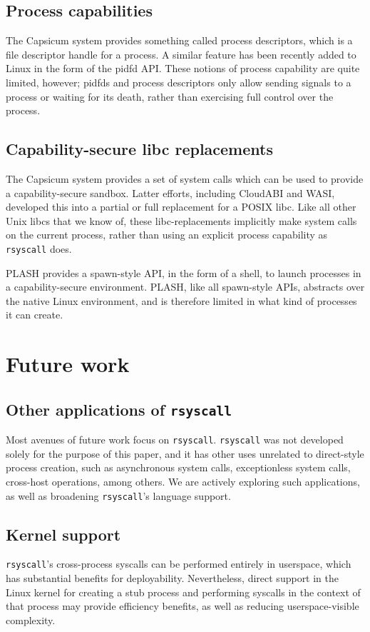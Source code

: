 \documentclass[letterpaper,twocolumn,10pt]{article}
\begin{document}
\subsection{Process capabilities}
The Capsicum system provides something called process descriptors\cite{capsicum},
which is a file descriptor handle for a process.
A similar feature has been recently added to Linux in the form of the pidfd API\cite{pidfd}.
These notions of process capability are quite limited, however;
pidfds and process descriptors only allow sending signals to a process or waiting for its death,
rather than exercising full control over the process.
\subsection{Capability-secure libc replacements}
The Capsicum system provides a set of system calls
which can be used to provide a capability-secure sandbox.\cite{capsicum}
Latter efforts\cite{oblivious}, including CloudABI\cite{cloudabi} and WASI\cite{wasi},
developed this into a partial or full replacement for a POSIX libc.
Like all other Unix libcs that we know of,
these libc-replacements implicitly make system calls on the current process,
rather than using an explicit process capability as \texttt{rsyscall} does.

PLASH provides a spawn-style API, in the form of a shell,
to launch processes in a capability-secure environment.\cite{plash}
PLASH, like all spawn-style APIs, abstracts over the native Linux environment,
and is therefore limited in what kind of processes it can create.
\section{Future work}\label{future_work}
\subsection{Other applications of \texttt{rsyscall}}
Most avenues of future work focus on \texttt{rsyscall}.
\texttt{rsyscall} was not developed solely for the purpose of this paper,
and it has other uses unrelated to direct-style process creation,
such as asynchronous system calls, exceptionless system calls\cite{flexsc}, cross-host operations, among others.
We are actively exploring such applications,
as well as broadening \texttt{rsyscall}'s language support.
\subsection{Kernel support}
\texttt{rsyscall}'s cross-process syscalls can be performed entirely in userspace,
which has substantial benefits for deployability.
Nevertheless, direct support in the Linux kernel
for creating a stub process and performing syscalls in the context of that process
may provide efficiency benefits, as well as reducing userspace-visible complexity.
\end{document}
